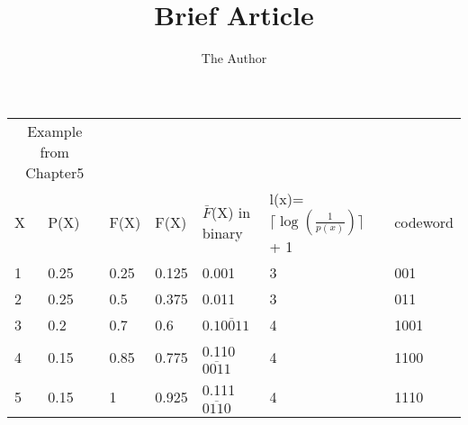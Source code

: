 \documentclass[11pt]{amsart}
\title{Brief Article}
\author{The Author}
\begin{document}
\maketitle
\begin{table}[htbp]
   \centering
   \begin{tabular}{@{} | l | l | l | l | l | l | l | @{}} %
      \multicolumn{2}{c}{Example from Chapter5} \\
      X & P(X) & F(X)  & F(X) & $\bar{F}$(X) in binary & l(x)= $\lceil \log(\frac{1}{p(x)}) \rceil$ + 1 & codeword  \\
      1 & 0.25 & 0.25 & 0.125 & 0.001 & 3 & 001\\ 
      2 & 0.25 & 0.5 & 0.375 & 0.011 & 3 & 011\\ 
      3 & 0.2 & 0.7 & 0.6 & 0.$\overline{10011}$ & 4 & 1001\\ 
      4 & 0.15 & 0.85 & 0.775 & 0.110$\overline{0011}$ & 4 & 1100\\ 
      5 & 0.15 & 1 & 0.925 & 0.111$\overline{0110}$ & 4 & 1110\\             
   \end{tabular}
\end{table}
\end{document}
